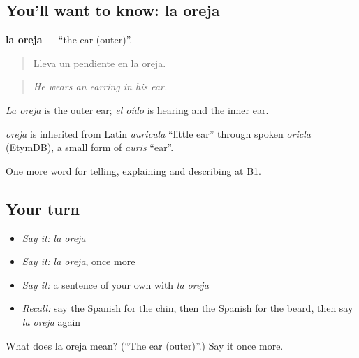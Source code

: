 \subsection*{You'll want to know: la oreja}
\textbf{la oreja} — \textquotedblleft{}the ear (outer)\textquotedblright{}.

\begin{quote}
Lleva un pendiente en la oreja.
\end{quote}

\begin{quote}
\emph{He wears an earring in his ear.}
\end{quote}

\emph{La oreja} is the outer ear; \emph{el oído} is hearing and the inner ear.

\begin{cousinweb}
\emph{oreja} is inherited from Latin \emph{auricula} \textquotedblleft{}little ear\textquotedblright{} through spoken \emph{oricla} (EtymDB), a small form of \emph{auris} \textquotedblleft{}ear\textquotedblright{}.
\end{cousinweb}

\begin{grammarlens}[title={What you've built}]
One more word for telling, explaining and describing at B1.
\end{grammarlens}

\subsection*{Your turn}
\begin{itemize}
\raggedright
  \item \emph{Say it:} \emph{la oreja}
  \item \emph{Say it:} \emph{la oreja}, once more
  \item \emph{Say it:} a sentence of your own with \emph{la oreja}
  \item \emph{Recall:} say the Spanish for the chin, then the Spanish for the beard, then say \emph{la oreja} again
\end{itemize}

\begin{tcolorbox}[breakable,colback=teal!4,colframe=teal!35!black,title={Before you move on}]
What does la oreja mean? (\textquotedblleft{}The ear (outer)\textquotedblright{}.) Say it once more.
\end{tcolorbox}
